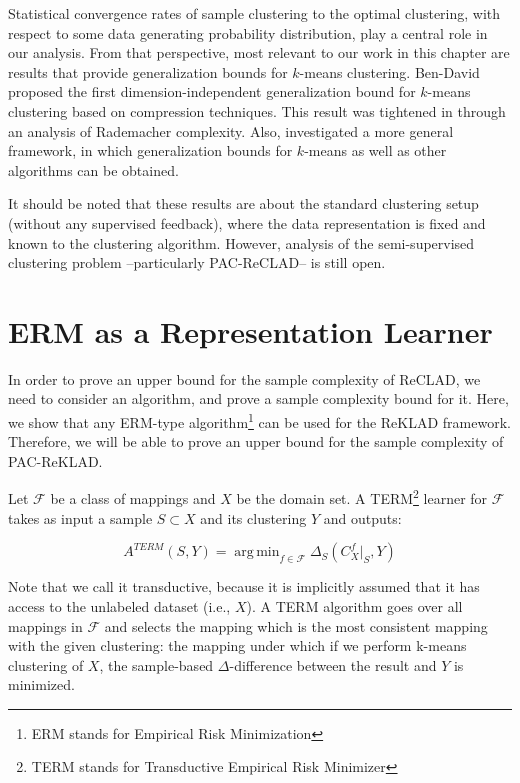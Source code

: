 \documentclass[letterpaper,12pt,titlepage,oneside,final]{book}
\DeclareMathOperator*{\argmin}{arg\,min}
\begin{document}
Statistical convergence rates of sample clustering to the optimal clustering, with respect to some data generating probability distribution, play a central role in our analysis.
From that perspective, most relevant to our work in this chapter are results that provide generalization bounds for $k$-means clustering. Ben-David \cite{ben2007framework} proposed the first dimension-independent generalization bound for $k$-means clustering based on compression techniques. This result was tightened in \cite{biau2008performance} through an analysis of Rademacher complexity. Also, \cite{maurer2010dimensional} investigated a more general framework, in which generalization bounds for $k$-means as well as other algorithms can be obtained. 

It should be noted that these results are about the standard clustering setup (without any supervised feedback), where the data representation is fixed and known to the clustering algorithm. However, analysis of the semi-supervised clustering problem --particularly PAC-ReCLAD-- is still open.


\section{ERM as a Representation Learner}
\label{ERM}

In order to prove an upper bound for the sample complexity of ReCLAD, we need to consider an algorithm, and prove a sample complexity bound for it. Here, we show that any ERM-type algorithm\footnote{ERM stands for Empirical Risk Minimization} can be used for the ReKLAD framework. Therefore, we will be able to prove an upper bound for the sample complexity of PAC-ReKLAD. 

Let $\mathcal{F}$ be a class of mappings and $X$ be the domain set. A TERM\footnote{TERM stands for Transductive Empirical Risk Minimizer} learner for $\mathcal{F}$ takes as input a sample $S\subset X$ and its clustering $Y$ and outputs:

\begin{equation}
A^{TERM}(S, Y) = \argmin_{f\in \mathcal{F}} \Delta_S(C^{f}_{X}\Big|_S, Y)
\end{equation}

Note that we call it transductive, because it is implicitly assumed that it has access to the unlabeled dataset (i.e., $X$). A TERM algorithm goes over all mappings in $\mathcal{F}$ and selects the mapping which is the most consistent mapping with the given clustering: the mapping under which if we perform k-means clustering of $X$, the sample-based $\Delta$-difference between the result and $Y$ is minimized. 
\end{document}
